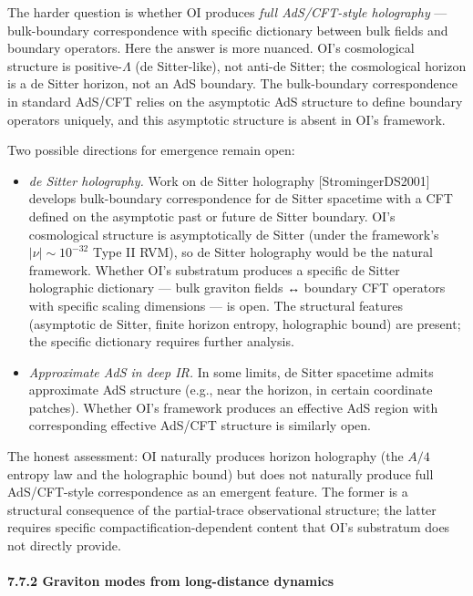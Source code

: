 \documentclass[
]{article}
\begin{document}
The harder question is whether OI produces \emph{full AdS/CFT-style
holography} --- bulk-boundary correspondence with specific dictionary
between bulk fields and boundary operators. Here the answer is more
nuanced. OI's cosmological structure is positive-\(\Lambda\) (de
Sitter-like), not anti-de Sitter; the cosmological horizon is a de
Sitter horizon, not an AdS boundary. The bulk-boundary correspondence in
standard AdS/CFT relies on the asymptotic AdS structure to define
boundary operators uniquely, and this asymptotic structure is absent in
OI's framework.

Two possible directions for emergence remain open:

\begin{itemize}
\item
  \emph{de Sitter holography.} Work on de Sitter holography
  {[}StromingerDS2001{]} develops bulk-boundary correspondence for de
  Sitter spacetime with a CFT defined on the asymptotic past or future
  de Sitter boundary. OI's cosmological structure is asymptotically de
  Sitter (under the framework's \(|\nu| \sim 10^{-32}\) Type II RVM), so
  de Sitter holography would be the natural framework. Whether OI's
  substratum produces a specific de Sitter holographic dictionary ---
  bulk graviton fields ↔ boundary CFT operators with specific scaling
  dimensions --- is open. The structural features (asymptotic de Sitter,
  finite horizon entropy, holographic bound) are present; the specific
  dictionary requires further analysis.
\item
  \emph{Approximate AdS in deep IR.} In some limits, de Sitter spacetime
  admits approximate AdS structure (e.g., near the horizon, in certain
  coordinate patches). Whether OI's framework produces an effective AdS
  region with corresponding effective AdS/CFT structure is similarly
  open.
\end{itemize}

The honest assessment: OI naturally produces horizon holography (the
\(A/4\) entropy law and the holographic bound) but does not naturally
produce full AdS/CFT-style correspondence as an emergent feature. The
former is a structural consequence of the partial-trace observational
structure; the latter requires specific compactification-dependent
content that OI's substratum does not directly provide.

\hypertarget{graviton-modes-from-long-distance-dynamics}{%
\paragraph{7.7.2 Graviton modes from long-distance
dynamics}\label{graviton-modes-from-long-distance-dynamics}}
\end{document}
